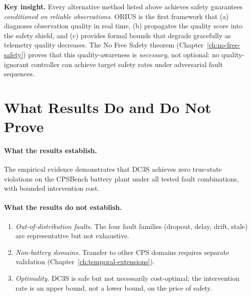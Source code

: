\noindent\textbf{Key insight.}  Every alternative method listed above
achieves safety guarantees \emph{conditioned on reliable observations}.
ORIUS is the first framework that (a) diagnoses observation quality in
real time, (b) propagates the quality score into the safety shield, and
(c) provides formal bounds that degrade gracefully as telemetry quality
decreases.  The No Free Safety theorem (Chapter~\ref{ch:no-free-safety})
proves that this quality-awareness is \emph{necessary}, not optional:
no quality-ignorant controller can achieve target safety rates under
adversarial fault sequences.

\section{What Results Do and Do Not Prove}

\paragraph{What the results establish.}
The empirical evidence demonstrates that DC3S achieves zero true-state
violations on the CPSBench battery plant under all tested fault
combinations, with bounded intervention cost.

\paragraph{What the results do not establish.}
\begin{enumerate}
  \item \emph{Out-of-distribution faults.}  The four fault families
    (dropout, delay, drift, stale) are representative but not exhaustive.
  \item \emph{Non-battery domains.}  Transfer to other CPS domains
    requires separate validation (Chapter~\ref{ch:temporal-extensions}).
  \item \emph{Optimality.}  DC3S is safe but not necessarily cost-optimal;
    the intervention rate is an upper bound, not a lower bound, on the
    price of safety.
\end{enumerate}

